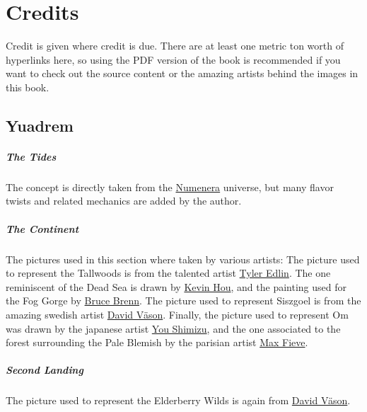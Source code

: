 \section{Credits}
\begin{linenumbers}
Credit is given where credit is due.
There are at least one metric ton worth of hyperlinks here, so using the PDF version of the book is recommended if you want to check out the source content or the amazing artists behind the images in this book.

\subsection*{Yuadrem}
\subparagraph{The Tides} The concept is directly taken from the \href{http://numenera.com/}{Numenera} universe, but many flavor twists and related mechanics are added by the author.

\subparagraph{The Continent} The pictures used in this section where taken by various artists:
The picture used to represent the Tallwoods is from the talented artist \href{https://www.artstation.com/tyleredlinart}{Tyler Edlin}.
The one reminiscent of the Dead Sea is drawn by \href{https://www.artstation.com/knightblur}{Kevin Hou}, and the painting used for the Fog Gorge by \href{https://www.artstation.com/brucebrenn}{Bruce Brenn}.
The picture used to represent Siszgoel is from the amazing swedish artist \href{https://www.artstation.com/davidvason}{David V\"ason}.
Finally, the picture used to represent Om was drawn by the japanese artist \href{https://www.pixiv.net/en/users/2830609}{You Shimizu}, and the one associated to the forest surrounding the Pale Blemish by the parisian artist \href{https://www.artstation.com/maxfieve}{Max Fieve}.

\subparagraph{Second Landing} The picture used to represent the Elderberry Wilds is again from \href{https://www.artstation.com/davidvason}{David V\"ason}.




\end{linenumbers}
